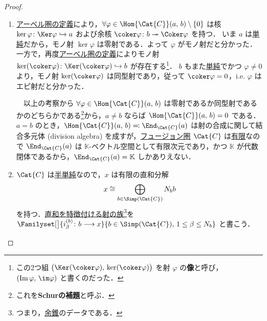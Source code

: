 \documentclass[TQFT_main]{subfiles}
\begin{document}
\begin{proof}
    \begin{enumerate}
        \item \hyperref[def:additive-cat]{アーベル圏の定義}により，$\forall \varphi \in \Hom{\Cat{C}}(a,\, b) \setminus \{0\}$ は核 $\ker \varphi \colon \Ker \varphi \hookrightarrow a$ および余核 $\coker \varphi \colon b \twoheadrightarrow \Coker \varphi$ を持つ．
        いま $a$ は\hyperref[def:semisimple-cat]{単純}だから，モノ射 $\ker \varphi$ は零射である．よって $\varphi$ がモノ射だと分かった．
        一方で，再度\hyperref[def:additive-cat]{アーベル圏の定義}によりモノ射 $\ker (\coker \varphi) \colon \Ker (\coker \varphi) \hookrightarrow b$ が存在する\footnote{この2つ組 $\bigl(\Ker (\coker \varphi),\, \ker (\coker \varphi)\bigr)$ を射 $\varphi$ の\textbf{像}と呼び，$(\Im \varphi,\, \im \varphi)$ と書くのだった．}．
        $b$ もまた\hyperref[def:semisimple-cat]{単純}でかつ $\varphi \neq 0$ より，モノ射 $\ker (\coker \varphi)$ は同型射であり，従って $\coker \varphi = 0$，i.e. $\varphi$ はエピ射だと分かった．

        　以上の考察から $\forall \varphi \in \Hom{\Cat{C}}(a,\, b)$ は零射であるか同型射であるかのどちらかである\footnote{これを\textbf{Schurの補題}と呼ぶ．}から，$a \neq b$ ならば $\Hom{\Cat{C}}(a,\, b) = 0$ である．$a = b$ のとき，$\Hom{\Cat{C}}(a,\, b) \eqqcolon \End_{\Cat{C}}(a)$ は射の合成に関して結合多元体 (division algebra) を成すが，\hyperref[def:tensorfusion-cat]{フュージョン圏} $\Cat{C}$ は\hyperref[def:finite-abcat]{有限}なので $\End_{\Cat{C}}(a)$ は $\mathbb{K}$-ベクトル空間として有限次元であり，かつ $\mathbb{K}$ が代数閉体であるから，$\End_{\Cat{C}}(a) = \mathbb{K}$ しかありえない．

        \item $\Cat{C}$ は\hyperref[def:semisimple-cat]{半単純}なので，$x$ は有限の直和分解
        \begin{align}
            x \cong \bigoplus_{b \in \Simp(\Cat{C})} N_b b
        \end{align}
        を持つ．\hyperref[def:product-coproduct]{直和を特徴付ける射の族}\footnote{つまり，\hyperref[def:coCone]{余錐}のデータである．}を $\Familyset[\big]{i^{(b)}_\beta \colon b \lto x}{b \in \Simp(\Cat{C}),\, 1 \le \beta \le N_b}$ と書こう． 
        

\end{enumerate}
\end{proof}
\end{document}
